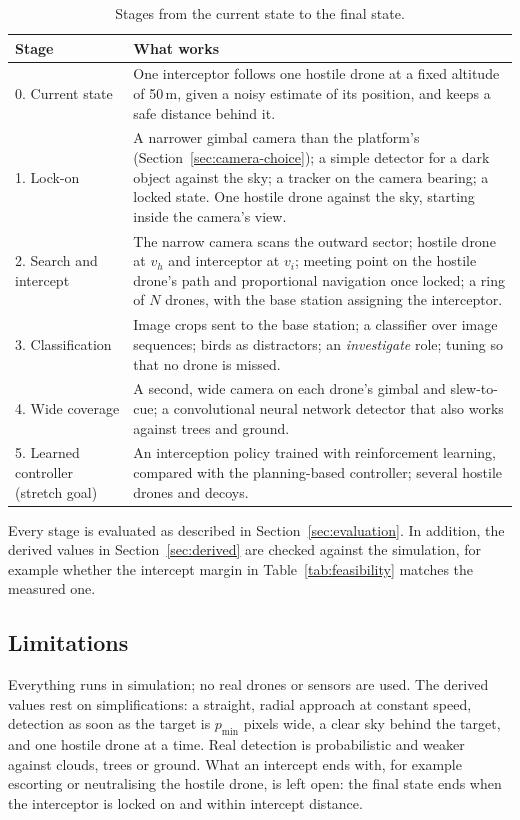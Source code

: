 \begin{table}[H]
\centering
\small
\begin{tabular}{|p{}|p{}|}
\hline
\textbf{Stage} & \textbf{What works} \\
\hline
0. Current state &
One interceptor follows one hostile drone at a fixed altitude of 50\,m,
given a noisy estimate of its position, and keeps a safe distance behind it. \\
\hline
1. Lock-on &
A narrower gimbal camera than the platform's (Section~\ref{sec:camera-choice}); a simple detector for a dark object against the sky;
a tracker on the camera bearing; a locked state. One hostile drone against
the sky, starting inside the camera's view. \\
\hline
2. Search and intercept &
The narrow camera scans the outward sector; hostile drone at $v_h$ and
interceptor at $v_i$; meeting point on the hostile drone's path and
proportional navigation once locked; a ring of $N$ drones, with the base
station assigning the interceptor. \\
\hline
3. Classification &
Image crops sent to the base station; a classifier over image sequences;
birds as distractors; an \emph{investigate} role; tuning so that no drone is
missed. \\
\hline
4. Wide coverage &
A second, wide camera on each drone's gimbal and slew-to-cue; a convolutional neural network
detector that also works against trees and ground. \\
\hline
5. Learned controller (stretch goal) &
An interception policy trained with reinforcement learning, compared with the
planning-based controller; several hostile drones and decoys. \\
\hline
\end{tabular}
\caption{Stages from the current state to the final state.}
\label{tab:stages}
\end{table}

Every stage is evaluated as described in Section~\ref{sec:evaluation}. In
addition, the derived values in Section~\ref{sec:derived} are checked against
the simulation, for example whether the intercept margin in
Table~\ref{tab:feasibility} matches the measured one.

\subsection{Limitations}

Everything runs in simulation; no real drones or sensors are used. The
derived values rest on simplifications: a straight, radial approach at
constant speed, detection as soon as the target is $p_{\min}$ pixels wide, a
clear sky behind the target, and one hostile drone at a time. Real detection
is probabilistic and weaker against clouds, trees or ground. What an intercept
ends with, for example escorting or neutralising the hostile drone, is left
open: the final state ends when the interceptor is locked on and within
intercept distance.
